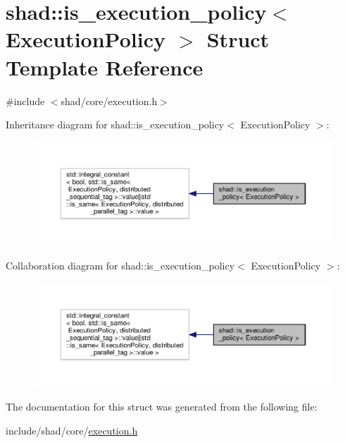 \hypertarget{structshad_1_1is__execution__policy}{\section{shad\-:\-:is\-\_\-execution\-\_\-policy$<$ Execution\-Policy $>$ Struct Template Reference}
\label{structshad_1_1is__execution__policy}
}


{\ttfamily \#include $<$shad/core/execution.\-h$>$}



Inheritance diagram for shad\-:\-:is\-\_\-execution\-\_\-policy$<$ Execution\-Policy $>$\-:
\nopagebreak
\begin{figure}[H]
\begin{center}
\leavevmode
\includegraphics[width=350pt]{structshad_1_1is__execution__policy__inherit__graph}
\end{center}
\end{figure}


Collaboration diagram for shad\-:\-:is\-\_\-execution\-\_\-policy$<$ Execution\-Policy $>$\-:
\nopagebreak
\begin{figure}[H]
\begin{center}
\leavevmode
\includegraphics[width=350pt]{structshad_1_1is__execution__policy__coll__graph}
\end{center}
\end{figure}


The documentation for this struct was generated from the following file\-:\begin{DoxyCompactItemize}
\item 
include/shad/core/\hyperlink{execution_8h}{execution.\-h}\end{DoxyCompactItemize}
